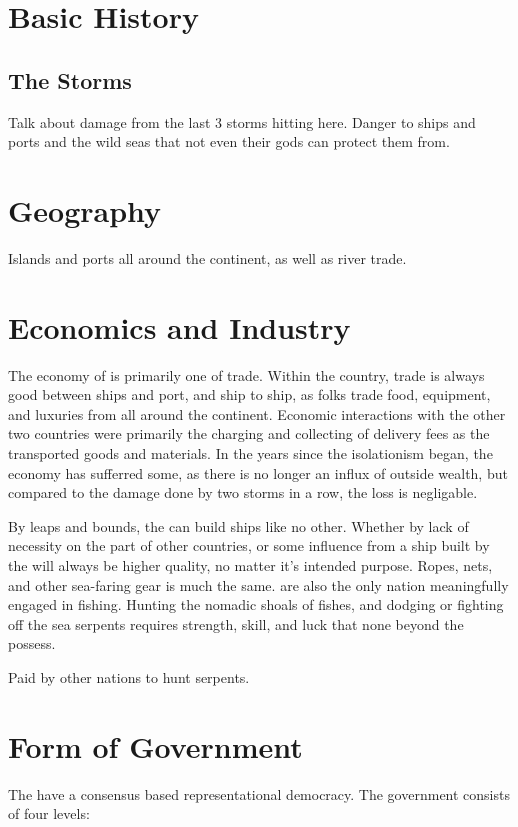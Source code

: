 \documentclass[blue]{GL2020}
\begin{document}
\name{\bVikings{}}

\section*{Basic History}


\subsection*{The Storms}
Talk about damage from the last 3 storms hitting here. Danger to ships and ports and the wild seas that not even their gods can protect them from.


\section*{Geography}
Islands and ports all around the continent, as well as river trade.

\section*{Economics and Industry}
The economy of \pShip{} is primarily one of trade. Within the country, trade is always good between ships and port, and ship to ship, as folks trade food, equipment, and luxuries from all around the continent. Economic interactions with the other two countries were primarily the charging and collecting of delivery fees as the \pShippies{} transported goods and materials. In the years since the isolationism began, the economy has sufferred some, as there is no longer an influx of outside wealth, but compared to the damage done by two storms in a row, the loss is negligable.

By leaps and bounds, the \pShippies{} can build ships like no other. Whether by lack of necessity on the part of other countries, or some influence from \cEbbFull{} a ship built by the \pShippies{} will always be higher quality, no matter it's intended purpose. Ropes, nets, and other sea-faring gear is much the same. \pShippies{} are also the only nation meaningfully engaged in fishing. Hunting the nomadic shoals of fishes, and dodging or fighting off the sea serpents requires strength, skill, and luck that none beyond the \pShippies{} possess.

Paid by other nations to hunt serpents.

\section*{Form of Government} The \pShippies{} have a consensus based representational democracy. The government consists of four levels:
\end{document}

